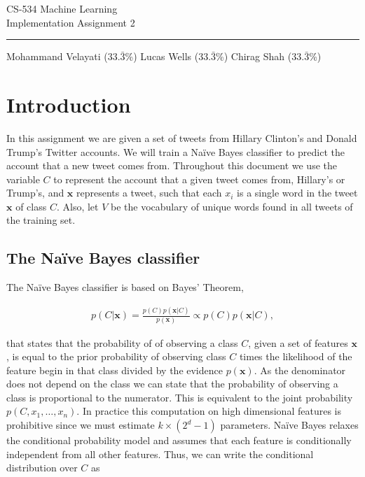 \documentclass{article}
\renewcommand{\vec}[1]{\mathbf{#1}}
\begin{document}
\begin{center}
	{\huge CS-534 Machine Learning} \\ \vspace{2mm}
	{\Large Implementation Assignment 2} \\ \vspace{2mm} \hrule \vspace{3mm}
	{\normalsize Mohammand Velayati ($33.\bar{3}$\%) \hspace{3mm}  Lucas Wells ($33.\bar{3}$\%) \hspace{3mm}  Chirag Shah ($33.\bar{3}$\%)} 
\end{center}

\section{Introduction}

In this assignment we are given a set of tweets from Hillary Clinton's and Donald Trump's Twitter accounts. We will train a Na\"{i}ve Bayes classifier to predict the account that a new tweet comes from. Throughout this document we use the variable $C$ to represent the account that a given tweet comes from, Hillary's or Trump's, and $\vec{x}$ represents a tweet, such that each $x_i$ is a single word in the tweet $\vec{x}$ of class $C$. Also, let $V$ be the vocabulary of unique words found in all tweets of the training set.

\subsection{The Na\"{i}ve Bayes classifier}

The Na\"{i}ve Bayes classifier is based on Bayes' Theorem,

\begin{align}
p(C|\vec{x}) = \frac{p(C)p(\vec{x}|C)}{p(\vec{x})} \propto p(C)p(\vec{x}|C),
\end{align}

\noindent
that states that the probability of of observing a class $C$, given a set of features $\vec{x}$, is equal to the prior probability of observing class $C$ times the likelihood of the feature begin in that class divided by the evidence $p(\vec{x})$. As the denominator does not depend on the class we can state that the probability of observing a class is proportional to the numerator. This is equivalent to the joint probability $p(C, x_1, \dots, x_n)$. In practice this computation on high dimensional features is prohibitive since we must estimate $k \times (2^d - 1)$ parameters. Na\"{i}ve Bayes relaxes the conditional probability model and assumes that each feature is conditionally independent from all other features. Thus, we can write the conditional distribution over $C$ as
\end{document}

